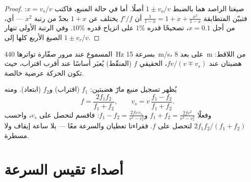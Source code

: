 \begin{proof}
صيغتا الراصد هما بالضبط $1 \pm v_o/v$ أصلًا. أما في حالة المنبع، فاكتب $x = v_s/v$:
فتبيّن المتطابقة $\frac{1}{1 - x} = 1 + x + \frac{x^2}{1 - x}$ أن $f'/f$ يختلف عن
$1 + x$ بحدّ من رتبة $x^2$ --- أي، من أجل $x = 0.1$، تصحيحًا قدره $1\%$ على انزياح قدره $10\%$.
وفي الرتبة الأولى تنهار الصيغ الأربع كلها إلى $1 \pm v_r/v$.
\end{proof}

\begin{omfigure}

{\small {} المسموع عند مرور صفّارة تواترها \qty{440}{Hz} بسرعة \qty{15}{m/s}، على بعد \qty{8}{m}
من اللاقط: هضبتان عند $fv/(v \mp v_s)$،  الحقيقي $f$ (المنقّط) يُعبَر
أساسًا عند أقرب اقتراب، حيث تكون الحركة عرضية خالصة.}
\end{omfigure}

\begin{method}\label{met:g12:doppler-effect:pass}
يُظهر تسجيل منبع مارّ هضبتين: $f_1$ (اقتراب) و$f_2$
(ابتعاد). ومنه
\[
f = \frac{2 f_1 f_2}{f_1 + f_2}, \qquad
v_s = v\,\frac{f_1 - f_2}{f_1 + f_2}.
\]
وفعلًا $f_1 + f_2 = \frac{2fv^2}{v^2 - v_s^2}$ و$f_1 - f_2 = \frac{2fv\,v_s}{v^2 - v_s^2}$:
فاقسم لتحصل على $v_s$، واحسب $2f_1 f_2/(f_1 + f_2)$ لتحصل على $f$. فقراءتا  تعطيان
  والسرعة معًا --- بلا ساعة إيقاف ولا مسطرة.
\end{method}

\section{أصداء تقيس السرعة}

